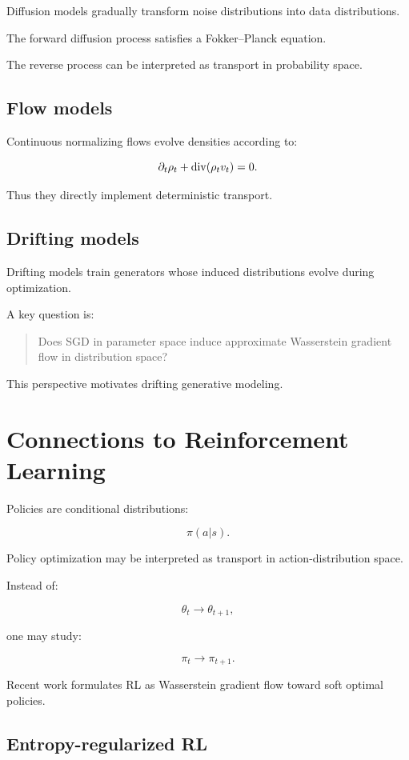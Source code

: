 Diffusion models gradually transform noise distributions into data distributions.

The forward diffusion process satisfies a Fokker--Planck equation.

The reverse process can be interpreted as transport in probability space.

\subsection{Flow models}

Continuous normalizing flows evolve densities according to:

\[
\partial_t \rho_t
+
\operatorname{div}(\rho_t v_t)=0.
\]

Thus they directly implement deterministic transport.

\subsection{Drifting models}

Drifting models train generators whose induced distributions evolve during optimization.

A key question is:

\begin{quote}
Does SGD in parameter space induce approximate Wasserstein gradient flow in distribution space?
\end{quote}

This perspective motivates drifting generative modeling.

\section{Connections to Reinforcement Learning}

Policies are conditional distributions:

\[
\pi(a|s).
\]

Policy optimization may be interpreted as transport in action-distribution space.

Instead of:

\[
\theta_t \to \theta_{t+1},
\]

one may study:

\[
\pi_t \to \pi_{t+1}.
\]

Recent work formulates RL as Wasserstein gradient flow toward soft optimal policies.

\subsection{Entropy-regularized RL}

